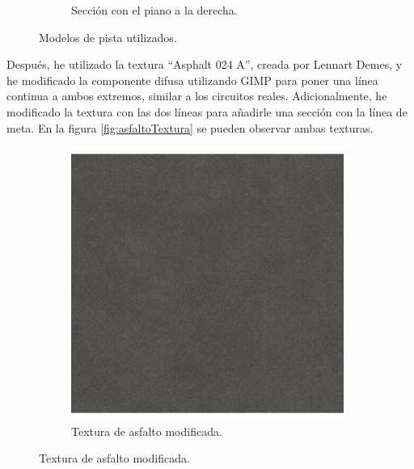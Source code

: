 \begin{figure}[H]
\begin{subfigure}[t]{0.48\textwidth}
        \caption{Sección con el piano a la derecha.}
        \label{fig:curvaR}
    \end{subfigure}
    \caption{Modelos de pista utilizados.}
    \label{fig:curvasmodelos}
\end{figure}

Después, he utilizado la textura ``Asphalt 024 A''\cite{asphalt}, creada por Lennart Demes, y he modificado la componente difusa utilizando GIMP para poner una línea continua a ambos extremos, similar a los circuitos reales. Adicionalmente, he modificado la textura con las dos líneas para añadirle una sección con la línea de meta. En la figura \ref{fig:asfaltoTextura} se pueden observar ambas texturas.

\begin{figure}[H]
    \centering 
	\begin{subfigure}[t]{0.48\textwidth}
	    \centering
        \includegraphics[width=0.98\textwidth,cframe=black 0.5pt 0pt]{imagenes/converted/pista/Asphalt024A_2K_Color.jpg}
        \caption{Textura de asfalto modificada.}
        \label{fig:asfaltomod}
    \end{subfigure}
    \hfill 

\end{figure}
